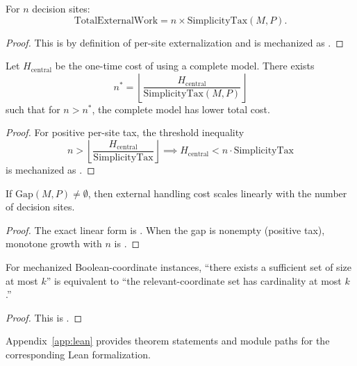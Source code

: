 \begin{theorem}\label{thm:tax-grows}
For $n$ decision sites:
\[
\text{TotalExternalWork} = n \times \text{SimplicityTax}(M, P).
\]
\end{theorem}

\begin{proof}
This is by definition of per-site externalization and is mechanized as
.
\end{proof}

\begin{theorem}[Amortization]\label{thm:amortization}
Let $H_{\text{central}}$ be the one-time cost of using a complete model. There exists
\[
n^* = \left\lfloor \frac{H_{\text{central}}}{\text{SimplicityTax}(M,P)} \right\rfloor
\]
such that for $n > n^*$, the complete model has lower total cost.
\end{theorem}

\begin{proof}
For positive per-site tax, the threshold inequality
\[
n > \left\lfloor \frac{H_{\text{central}}}{\text{SimplicityTax}} \right\rfloor
\implies
H_{\text{central}} < n\cdot \text{SimplicityTax}
\]
is mechanized as
.
\end{proof}

\begin{corollary}\label{cor:gap-externalization}
If $\text{Gap}(M,P)\neq\emptyset$, then external handling cost scales linearly with the number of decision sites.
\end{corollary}

\begin{proof}
The exact linear form is
.
When the gap is nonempty (positive tax), monotone growth with $n$ is
.
\end{proof}

\begin{corollary}\label{cor:gap-minimization-hard}
For mechanized Boolean-coordinate instances, ``there exists a sufficient set of size at most $k$'' is equivalent to ``the relevant-coordinate set has cardinality at most $k$.''
\end{corollary}

\begin{proof}
This is .
\end{proof}

Appendix~\ref{app:lean} provides theorem statements and module paths for the corresponding Lean formalization.
